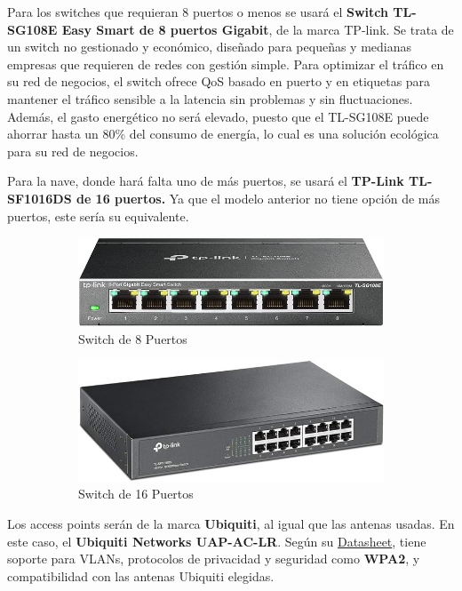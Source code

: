 \documentclass{article}
\begin{document}
\quad

Para los switches que requieran 8 puertos o menos se usará el \textbf{Switch TL-SG108E Easy Smart de 8 puertos Gigabit}, de la marca TP-link. Se trata de un switch no gestionado y económico, diseñado para pequeñas y medianas empresas que requieren de redes con gestión simple. Para optimizar el tráfico en su red de negocios, el switch ofrece QoS basado en puerto y en etiquetas para mantener el tráfico sensible a la latencia sin problemas y sin fluctuaciones. Además, el gasto energético no será elevado, puesto que el TL-SG108E puede ahorrar hasta un 80\% del consumo de energía, lo cual es una solución ecológica para su red de negocios. 

Para la nave, donde hará falta uno de más puertos, se usará el \textbf{TP-Link TL-SF1016DS de 16 puertos.} Ya que el modelo anterior no tiene opción de más puertos, este sería su equivalente. 
\newpage

\begin{figure}[h]
	\centering
	\begin{subfigure}{0.3\textwidth}
		\includegraphics[width=\linewidth]{src/switch 8.jpg}
		\caption{Switch de 8 Puertos}
		\label{fig:switch8}
	\end{subfigure}%
	\begin{subfigure}{0.3\textwidth}
		\includegraphics[width=\linewidth]{src/switch 16.jpg}
		\caption{Switch de 16 Puertos}
		\label{fig:switch16}
	\end{subfigure}
	\caption{}
	\label{fig:switches}
\end{figure}

Los access points serán de la marca \textbf{Ubiquiti}, al igual que las antenas usadas. En este caso, el \textbf{Ubiquiti Networks UAP-AC-LR}. Según su \href{https://dl.ubnt.com/datasheets/unifi/UniFi_AC_APs_DS.pdf}{Datasheet}, tiene soporte para VLANs, protocolos de privacidad y seguridad como \textbf{WPA2}, y compatibilidad con las antenas Ubiquiti elegidas.
\end{document}
